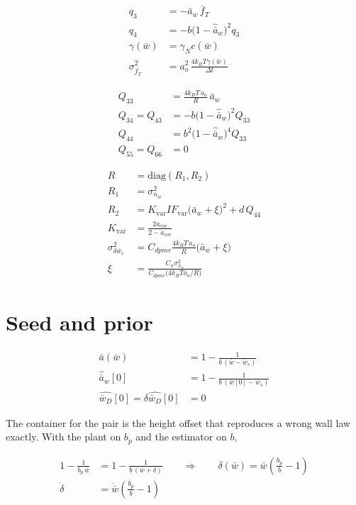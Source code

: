 \documentclass[11pt,a4paper,fontset=none]{ctexart}
\newcommand{\ba}{\bar{a}}
\newcommand{\bw}{\bar{w}}
\newcommand{\bwD}{\bar{w}_D}
\begin{document}
\begin{align*}
q_3 &= -\ba_w\,\bar{f}_T \\
q_4 &= -b\bigl(1-\hat{\ba}_w\bigr)^{2}q_3 \\
\gamma(\bw) &= \gamma_N c(\bw) \\
\sigma^{2}_{\bar{f}_T} &= a_o^{2}\,\frac{4k_BT\gamma(\bw)}{\Delta t}
\end{align*}

\begin{align*}
Q_{33} &= \frac{4k_BT\,a_o}{R}\,\ba_w \\
Q_{34} = Q_{43} &= -b\bigl(1-\hat{\ba}_w\bigr)^{2}Q_{33} \\
Q_{44} &= b^{2}\bigl(1-\hat{\ba}_w\bigr)^{4}Q_{33} \\
Q_{55} = Q_{66} &= 0
\end{align*}

\begin{align*}
R &= \mathrm{diag}(R_1, R_2) \\
R_1 &= \sigma^{2}_{n_w} \\
R_2 &= K_{\mathrm{var}} IF_{\mathrm{var}}\bigl(\ba_w+\xi\bigr)^{2} + d\,Q_{44} \\
K_{\mathrm{var}} &= \frac{2a_{\mathrm{cov}}}{2-a_{\mathrm{cov}}} \\
\sigma^{2}_{\delta\bw_r} &= C_{dpmr}\frac{4k_BT\,a_o}{R}\bigl(\ba_w+\xi\bigr) \\
\xi &= \frac{C_n\sigma^{2}_{n_w}}{C_{dpmr}\bigl(4k_BT a_o/R\bigr)}
\end{align*}

\section*{Seed and prior}

\begin{align*}
\ba(\bw) &= 1 - \frac{1}{b\,(\bw-\bw_s)} \\
\hat{\ba}_w[0] &= 1 - \frac{1}{b\,(\bw[0]-\bw_s)} \\
\hat{\bwD}[0] = \delta\hat{\bwD}[0] &= 0
\end{align*}

The container for the pair is the height offset that reproduces a wrong wall
law exactly. With the plant on $b_p$ and the estimator on $b$,

\begin{align*}
1 - \frac{1}{b_p\,\bw} &= 1 - \frac{1}{b\,(\bw+\delta)}
  \qquad\Longrightarrow\qquad
  \delta(\bw) = \bw\left(\frac{b_p}{b}-1\right) \\
\dot{\delta} &= \dot{\bw}\left(\frac{b_p}{b}-1\right)
\end{align*}
\end{document}
